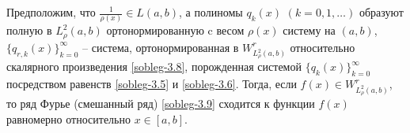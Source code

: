 

\begin{theorem}\label{soblegstate2}
Предположим, что  $ \frac{1}{\rho(x)}\in L(a,b) $, а  полиномы $q_k(x)$ $(k=0,1,\ldots)$  образуют полную в $L^2_\rho(a,b)$ ортонормированную   c весом   $\rho(x)$ систему на $(a,b)$, $\{q_{r,k}(x)\}_{k=0}^\infty$ -- система, ортонормированная в $W^r_{L^2_\rho(a,b)}$ относительно скалярного произведения \eqref{sobleg-3.8}, порожденная системой $\{q_{k}(x)\}_{k=0}^\infty$ посредством равенств \eqref{sobleg-3.5} и \eqref{sobleg-3.6}.
Тогда, если $f(x)\in W^r_{L^2_\rho(a,b)}$, то ряд Фурье (смешанный ряд) \eqref{sobleg-3.9} сходится к функции $f(x)$ равномерно относительно $x\in[a,b]$.
\end{theorem}


